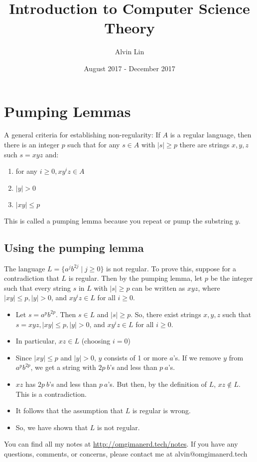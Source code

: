 \documentclass{math}
\title{Introduction to Computer Science Theory}
\author{Alvin Lin}
\date{August 2017 - December 2017}
\begin{document}
\maketitle

\section*{Pumping Lemmas}
A general criteria for establishing non-regularity: If \( A \) is a regular
language, then there is an integer \( p \) such that for any \( s\in A \) with
\( |s|\ge p \) there are strings \( x,y,z \) such \( s = xyz \) and:
\begin{enumerate}
  \item for any \( i\ge0, xy^iz\in A \)
  \item \( |y| > 0 \)
  \item \( |xy|\le p \)
\end{enumerate}
This is called a pumping lemma because you repeat or pump the substring \( y \).

\subsection*{Using the pumping lemma}
The language \( L = \{a^jb^{2j}\mid j\ge 0\} \) is not regular. To prove this,
suppose for a contradiction that \( L \) is regular. Then by the pumping lemma,
let \( p \) be the integer such that every string \( s \) in \( L \) with
\( |s|\ge p \) can be written as \( xyz \), where \( |xy|\le p, |y| > 0 \), and
\( xy^iz\in L \) for all \( i\ge0 \).
\begin{itemize}
  \item Let \( s = a^pb^{2p} \). Then \( s\in L \) and \( |s|\ge p \). So, there
  exist strings \( x,y,z \) such that \( s = xyz, |xy|\le p, |y| > 0 \), and
  \( xy^iz\in L \) for all \( i\ge0 \).
  \item In particular, \( xz\in L \) (choosing \( i = 0 \))
  \item Since \( |xy|\le p \) and \( |y| > 0 \), \( y \) consists of 1 or more
  \( a \)'s. If we remove \( y \) from \( a^pb^{2p} \), we get a string with
  \( 2p~b \)'s and less than \( p~a \)'s.
  \item \( xz \) has \( 2p~b \)'s and less than \( p~a \)'s. But then, by the
  definition of \( L \), \( xz\notin L \). This is a contradiction.
  \item It follows that the assumption that \( L \) is regular is wrong.
  \item So, we have shown that \( L \) is not regular.
\end{itemize}

\begin{center}
  You can find all my notes at \url{http://omgimanerd.tech/notes}. If you have
  any questions, comments, or concerns, please contact me at
  alvin@omgimanerd.tech
\end{center}
\end{document}
